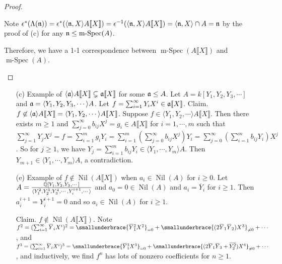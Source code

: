 \begin{proof}
\begin{enumerate}
            Note $\epsilon^*(\Lambda(\mathfrak{n})) = \epsilon^*(\langle \mathfrak{n},X \rangle A\llbracket X \rrbracket)= \epsilon^{-1}(\langle \mathfrak{n},X \rangle A\llbracket X \rrbracket) = \langle \mathfrak{n},X \rangle \cap A = \mathfrak{n}$ by the proof of (c) for any $\mathfrak{n} \leq \operatorname{m-Spec}(A)$. \par 
            Therefore, we have a 1-1 correspondence between $\operatorname{m-Spec}(A\llbracket X \rrbracket)$ and $\operatorname{m-Spec}(A)$.
        \qedhere
    \end{enumerate}
\end{proof}

\begin{example}
    \begin{enumerate}
        \item [(c)] Example of $\langle \mathfrak{a} \rangle A\llbracket X \rrbracket \subsetneq \mathfrak{a}\llbracket X \rrbracket$ for some $\mathfrak{a} \leq A$. Let $A = k[Y_1,Y_2,Y_3,\cdots]$ and $\mathfrak{a} = \langle Y_1,Y_2,Y_3,\cdots \rangle A$. Let $f = \sum_{i=1}^\infty Y_iX^i \in \mathfrak{a} \llbracket X \rrbracket$. Claim. $f \not \in \langle \mathfrak{a} \rangle A\llbracket X \rrbracket = \langle Y_1,Y_2,\cdots \rangle A\llbracket X \rrbracket$. Suppose $f \in \langle Y_1,Y_2,\cdots \rangle A\llbracket X \rrbracket$. Then there exists $m \geq 1$ and $\sum_{j=0}^\infty b_{ij}X^j = g_i \in A\llbracket X \rrbracket$ for $i = 1,\cdots,m$ such that $\sum_{j=1}^\infty Y_jX^j = f = \sum_{i=1}^m g_iY_i = \sum_{i=1}^m (\sum_{j=0}^\infty b_{ij}X^j)Y_i = \sum_{j=0}^\infty (\sum_{i=1}^m b_{ij}Y_i)X^j$. So for $j \geq 1$, we have $Y_j = \sum_{i=1}^m b_{ij}Y_i \in \langle Y_1,\cdots,Y_m \rangle A$. Then $Y_{m+1} \in \langle Y_1,\cdots,Y_m \rangle A$, a contradiction.
        \item [(e)]
            Example of $f \not \in \operatorname{Nil}(A\llbracket X \rrbracket)$ when $a_i \in \operatorname{Nil}(A)$ for $i \geq 0$. Let $A = \frac{\mathbb{Q}[Y_1,Y_2,Y_3,\cdots]}{\langle Y_1^2,Y_2^3,Y_3^4,\cdots,Y_i^{i+1},\cdots \rangle}$ and $a_0 = 0 \in \operatorname{Nil}(A)$ and $a_i = \overbar Y_i$ for $i \geq 1$. Then $a_i^{i+1} = \overbar{Y_i^{i+1}} = 0$ and so $a_i \in \operatorname{Nil}(A)$ for $i \geq 1$. \par 
            Claim. $f \not \in \operatorname{Nil}(A\llbracket X \rrbracket)$. Note $f^2 = (\sum_{i=1}^\infty \overbar Y_i X^i)^2 = \smallunderbrace{\overbar Y_1^2 X^2}_{= 0} + \smallunderbrace{(2\overbar Y_1 \overbar Y_2)X^3}_{\neq 0} + \cdots$, and $f^3 = (\sum_{i=1}^\infty \overbar Y_i X^i)^3 = \smallunderbrace{\overbar Y_1^3 X^3}_{= 0} + \smallunderbrace{(2\overbar Y_1 \overbar Y_3 + \overbar {Y_2^2})X^4}_{\neq 0} + \cdots$, and inductively, we find $f^n$ has lots of nonzero coefficients for $n \geq 1$.
    \end{enumerate}
\end{example}

